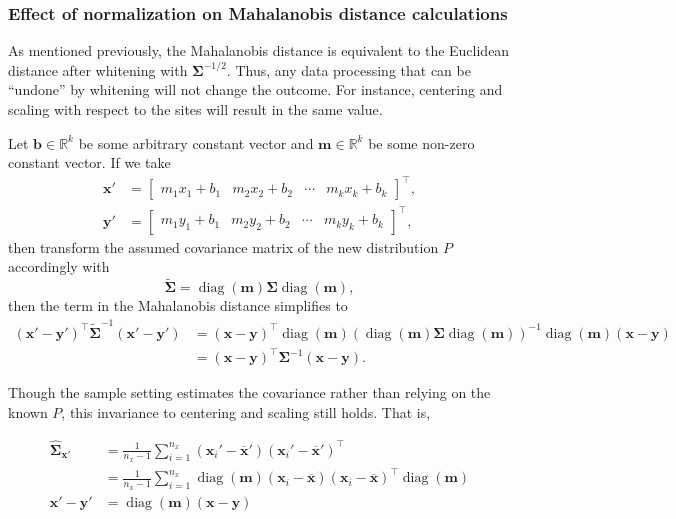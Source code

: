 \documentclass[
  10pt,
  letterpaper,
  DIV=11,
  numbers=noendperiod]{scrartcl}
\newcommand{\bfx}{\mathbf{x}}
\newcommand{\bfy}{\mathbf{y}}
\DeclareMathOperator{\diag}{diag}
\begin{document}
\subsubsection{Effect of normalization on Mahalanobis distance
calculations}\label{effect-of-normalization-on-mahalanobis-distance-calculations}

As mentioned previously, the Mahalanobis distance is equivalent to the
Euclidean distance after whitening with \({\pmb{\Sigma}}^{-1/2}\). Thus,
any data processing that can be ``undone'' by whitening will not change
the outcome. For instance, centering and scaling with respect to the
sites will result in the same value.

Let \(\mathbf{b} \in \mathbb{R}^k\) be some arbitrary constant vector
and \(\mathbf{m} \in \mathbb{R}^k\) be some non-zero constant vector. If
we take \[
\begin{aligned}
\bfx' &= \begin{bmatrix} m_1 x_1 + b_1 & m_2 x_2 + b_2 & \cdots & m_k x_k + b_k  \end{bmatrix}^\intercal, \\
\bfy' &= \begin{bmatrix} m_1 y_1 + b_1 & m_2 y_2 + b_2 & \cdots & m_k y_k + b_k  \end{bmatrix}^\intercal,
\end{aligned}
\] then transform the assumed covariance matrix of the new distribution
\(P\) accordingly with \[
\tilde{\pmb{\Sigma}} = \diag (\mathbf{m}) \pmb\Sigma \diag (\mathbf{m}),
\] then the term in the Mahalanobis distance simplifies to \[
\begin{aligned}
(\bfx' - \bfy')^\intercal \tilde{\pmb\Sigma}^{-1} (\bfx' - \bfy') &= 
(\bfx - \bfy)^\intercal \diag (\mathbf{m}) \left(  \diag (\mathbf{m}) \pmb\Sigma \diag (\mathbf{m}) \right)^{-1} \diag (\mathbf{m}) (\bfx - \bfy) \\
&= (\bfx - \bfy)^\intercal \pmb\Sigma^{-1} (\bfx - \bfy).
\end{aligned}
\]

Though the sample setting estimates the covariance rather than relying
on the known \(P\), this invariance to centering and scaling still
holds. That is,

\[
\begin{aligned}
\hat{\pmb\Sigma}_{\bfx'} &= \frac{1}{n_x - 1} \sum_{i = 1}^{n_x} (\bfx_i' - \overline{\bfx}') (\bfx_i' - \overline{\bfx}')^\intercal \\
&= \frac{1}{n_x - 1} \sum_{i = 1}^{n_x} \diag(\mathbf{m}) (\bfx_i - \overline{\bfx}) (\bfx_i - \overline{\bfx})^\intercal \diag (\mathbf{m}) \\
\bfx' - \bfy' &= \diag (\mathbf{m}) (\bfx - \bfy)
\end{aligned}
\]
\end{document}
